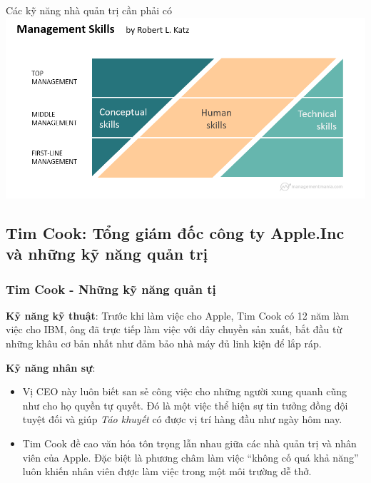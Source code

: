 \documentclass[10pt]{beamer}
\begin{document}
\begin{frame}{Các kỹ năng nhà quản trị cần phải có}
\transsplitverticalin
\centering
\includegraphics[scale=0.4]{Figs/fig6}
\end{frame}

\subsection{Tim Cook: Tổng giám đốc công ty Apple.Inc và những kỹ năng quản trị}
\begin{frame}
\transsplitverticalout
\frametitle{Tim Cook - Những kỹ năng quản tị}
\pause
\textbf{Kỹ năng kỹ thuật}:
Trước khi làm việc cho Apple, Tim Cook có 12 năm làm việc cho IBM, ông đã trực tiếp làm việc với dây chuyền sản xuất, bắt đầu từ những khâu cơ bản nhất như đảm bảo nhà máy đủ linh kiện để lắp ráp.
\pause

\vspace{15pt}
\textbf{Kỹ năng nhân sự}:
\begin{itemize}
\item Vị CEO này luôn biết san sẻ công việc cho những người xung quanh cũng như cho họ quyền tự quyết.
Đó là một việc thể hiện sự tin tưởng đồng đội tuyệt đối và giúp \emph{Táo khuyết} có được vị trí hàng đầu như ngày hôm nay.
\item Tim Cook đề cao văn hóa tôn trọng lẫn nhau giữa các nhà quản trị và nhân viên của Apple. Đặc biệt là phương châm làm việc “không cố quá khả năng” luôn khiến nhân viên được làm việc trong một môi trường dễ thở. 
\end{itemize}
\end{frame}
\end{document}
